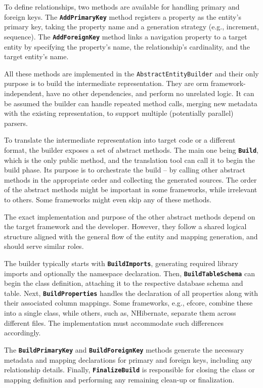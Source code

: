 To define relationships, two methods are available for handling primary and foreign keys. The \texttt{\textbf{AddPrimaryKey}} method registers a property as the entity’s primary key, taking the property name and a generation strategy (e.g., increment, sequence). The \texttt{\textbf{AddForeignKey}} method links a navigation property to a target entity by specifying the property's name, the relationship's cardinality, and the target entity's name.

All these methods are implemented in the \texttt{AbstractEntityBuilder} and their only purpose is to build the intermediate representation. They are \acrshort{orm} framework-independent, have no other dependencies, and perform no unrelated logic. It can be assumed the builder can handle repeated method calls, merging new metadata with the existing representation, to support multiple (potentially parallel) parsers. 


To translate the intermediate representation into target code or a different format, the builder exposes a set of abstract methods. The main one being \texttt{\textbf{Build}}, which is the only public method, and the translation tool can call it to begin the build phase. Its purpose is to orchestrate the build -- by calling other abstract methods in the appropriate order and collecting the generated sources. The order of the abstract methods might be important in some frameworks, while irrelevant to others. Some frameworks might even skip any of these methods.

The exact implementation and purpose of the other abstract methods depend on the target framework and the developer. However, they follow a shared logical structure aligned with the general flow of the entity and mapping generation, and should serve similar roles. 

The builder typically starts with \texttt{\textbf{BuildImports}}, generating required library imports and optionally the namespace declaration. Then, \texttt{\textbf{BuildTableSchema}} can begin the class definition, attaching it to the respective database schema and table. 
Next, \texttt{\textbf{BuildProperties}} handles the declaration of all properties along with their associated column mappings. Some frameworks, e.g., \acrshort{efcore}, combine these into a single class, while others, such as, NHibernate, separate them across different files. The implementation must accommodate such differences accordingly.

The \texttt{\textbf{BuildPrimaryKey}} and \texttt{\textbf{BuildForeignKey}} methods generate the necessary metadata and mapping declarations for primary and foreign keys, including any relationship details.
Finally, \texttt{\textbf{FinalizeBuild}} is responsible for closing the class or mapping definition and performing any remaining clean-up or finalization.

